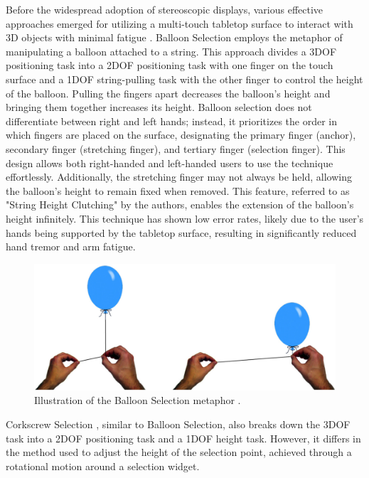     Before the widespread adoption of stereoscopic displays, various effective approaches emerged for utilizing a multi-touch tabletop surface to interact with 3D objects with minimal fatigue \cite{benkoBalloonSelectionMultiFinger2007, strothoffTriangleCursorInteractions2011, daiberBalloonSelectionRevisited2012}. Balloon Selection \cite{benkoBalloonSelectionMultiFinger2007} employs the metaphor of manipulating a balloon attached to a string. This approach divides a 3DOF positioning task into a 2DOF positioning task with one finger on the touch surface and a 1DOF string-pulling task with the other finger to control the height of the balloon. Pulling the fingers apart decreases the balloon's height and bringing them together increases its height. Balloon selection does not differentiate between right and left hands; instead, it prioritizes the order in which fingers are placed on the surface, designating the primary finger (anchor), secondary finger (stretching finger), and tertiary finger (selection finger). This design allows both right-handed and left-handed users to use the technique effortlessly. Additionally, the stretching finger may not always be held, allowing the balloon's height to remain fixed when removed. This feature, referred to as "String Height Clutching" by the authors, enables the extension of the balloon's height infinitely. This technique has shown low error rates, likely due to the user's hands being supported by the tabletop surface, resulting in significantly reduced hand tremor and arm fatigue.

    \begin{figure}[ht!]
        \centering
        \includegraphics[width=1\linewidth]{figures/balloon_selection.png}
        \caption{Illustration of the Balloon Selection metaphor \cite{benkoBalloonSelectionMultiFinger2007}.}
        \label{fig:sota_balloon}
    \end{figure}

    Corkscrew Selection \cite{benkoBalloonSelectionMultiFinger2007}, similar to Balloon Selection, also breaks down the 3DOF task into a 2DOF positioning task and a 1DOF height task. However, it differs in the method used to adjust the height of the selection point, achieved through a rotational motion around a selection widget.
    
